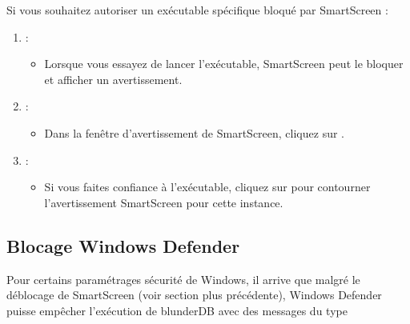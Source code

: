 \documentclass[letterpaper,10pt,french]{sphinxmanual}
\begin{document}
\begin{figure}[htbp]
\centering

\noindent{}
\end{figure}

\sphinxAtStartPar
Si vous souhaitez autoriser un exécutable spécifique bloqué par SmartScreen :
\begin{enumerate}
%
\item {} 
\sphinxAtStartPar
{} :
\begin{itemize}
\item {} 
\sphinxAtStartPar
Lorsque vous essayez de lancer l’exécutable, SmartScreen peut le bloquer
et afficher un avertissement.

\end{itemize}

\item {} 
\sphinxAtStartPar
{} :
\begin{itemize}
\item {} 
\sphinxAtStartPar
Dans la fenêtre d’avertissement de SmartScreen, cliquez sur .

\end{itemize}

\item {} 
\sphinxAtStartPar
{} :
\begin{itemize}
\item {} 
\sphinxAtStartPar
Si vous faites confiance à l’exécutable, cliquez sur  pour contourner l’avertissement SmartScreen pour cette instance.

\end{itemize}

\end{enumerate}


\subsection{Blocage Windows Defender}
\label{\detokenize{annexe_windows_securite:blocage-windows-defender}}
\sphinxAtStartPar
Pour certains paramétrages sécurité de Windows, il arrive que malgré le
déblocage de SmartScreen (voir section plus précédente), Windows Defender
puisse empêcher l’exécution de blunderDB avec des messages du type
\end{document}
